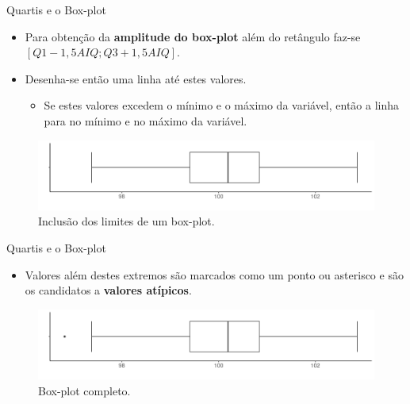 \documentclass[
  ignorenonframetext,
  serif,
  professionalfont,
  usenames,
  dvipsnames,
  aspectratio = 169]{beamer}
\providecommand{\tightlist}{%
  \setlength{\itemsep}{0pt}\setlength{\parskip}{0pt}}
\renewcommand{\tightlist}{%
  \setlength{\itemsep}{0\baselineskip}
  \setlength{\parskip}{0.25\baselineskip}
}
\begin{document}
\begin{frame}{Quartis e o Box-plot}
\label{quartis-e-o-box-plot-4}
\begin{itemize}
\item
  Para obtenção da \textbf{amplitude do box-plot} além do retângulo
  faz-se \([Q1-1,5AIQ; Q3+1,5AIQ]\).
\item
  Desenha-se então uma linha até estes valores.

  \begin{itemize}
  \tightlist
  \item
    Se estes valores excedem o mínimo e o máximo da variável, então a
    linha para no mínimo e no máximo da variável.
  \end{itemize}
\end{itemize}

\begin{figure}

{\centering \includegraphics[width=0.9\linewidth]{./img/boxplot3} 

}

\caption{Inclusão dos limites de um box-plot.}\label{fig:unnamed-chunk-15}
\end{figure}
\end{frame}

\begin{frame}{Quartis e o Box-plot}
\label{quartis-e-o-box-plot-5}
\begin{itemize}
\tightlist
\item
  Valores além destes extremos são marcados como um ponto ou asterisco e
  são os candidatos a \textbf{valores atípicos}.
\end{itemize}

\begin{figure}

{\centering \includegraphics[width=0.9\linewidth]{./img/boxplot0} 

}

\caption{Box-plot completo.}\label{fig:unnamed-chunk-16}
\end{figure}
\end{frame}
\end{document}
